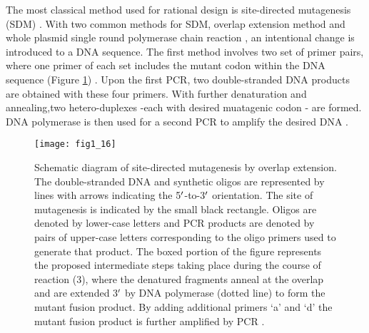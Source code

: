 \begin{refsection}
The most classical method used for rational design
is site-directed mutagenesis (SDM) \cite{Arnold1993}. With two common methods
for SDM, overlap extension method \cite{Ho1989} and whole plasmid single round
polymerase chain reaction \cite{Antikainen2005a}, an intentional change is
introduced to a DNA sequence. The first method involves two set of primer
pairs, where one primer of each set includes the mutant codon within the DNA
sequence (Figure \ref{fig:sdm-1}) \cite{Ho1989}. Upon the first PCR, two
double-stranded DNA products are obtained with these four primers. With further
denaturation and annealing,two hetero-duplexes -each with desired muatagenic
codon - are formed.  DNA polymerase is then used for a second PCR to amplify
the desired DNA \cite{Ho1989}. 
\begin{figure}[htbp] \centering \texttt{[image: fig1\_16]}
    \caption[Schematic diagram of site-directed mutagenesis by overlap
        extension. The double-stranded DNA and synthetic oligos are represented
        by lines with arrows indicating the 5$\rq$-to-3$\rq$ orientation. The site of
        mutagenesis is indicated by the small black rectangle. Oligos are
        denoted by lower-case letters and PCR products are denoted by pairs of
        upper-case letters corresponding to the oligo primers used to generate
        that product. The boxed portion of the figure represents the proposed
        intermediate steps taking place during the course of reaction (3),
        where the denatured fragments anneal at the overlap and are extended 3’
        by DNA polymerase (dotted line) to form the mutant fusion product. By
        adding additional primers ‘a’ and ‘d’ the mutant fusion product is
        further amplified by PCR.]
        {Schematic diagram of site-directed mutagenesis by overlap extension.
            The double-stranded DNA and synthetic oligos are represented by lines
            with arrows indicating the 5$\rq$-to-3$\rq$ orientation. The site of
            mutagenesis is indicated by the small black rectangle. Oligos are
            denoted by lower-case letters and PCR products are denoted by pairs
            of upper-case letters corresponding to the oligo primers used to
            generate that product. The boxed portion of the figure represents
            the proposed intermediate steps taking place during the course of
            reaction (3), where the denatured fragments anneal at the overlap
            and are extended 3$\rq$ by DNA polymerase (dotted line) to form the
            mutant fusion product. By adding additional primers ‘a’ and ‘d’ the
            mutant fusion product is further amplified by PCR \cite{Ho1989}.}
            \label{fig:sdm-1} 
\end{figure}



\end{refsection}
